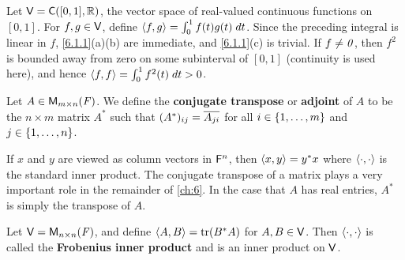 \begin{eg}\label{6.1.4}
  Let \(\V = \cfs([0, 1], \R)\), the vector space of real-valued continuous functions on \([0, 1]\).
  For \(f, g \in \mathsf{V}\), define \(\left\langle f, g\right\rangle = \int_0^1 f(t) g(t) \; dt\).
  Since the preceding integral is linear in \(f\), \cref{6.1.1}(a)(b) are immediate, and \cref{6.1.1}(c) is trivial.
  If \(f \neq \mathit{0}\), then \(f^2\) is bounded away from zero on some subinterval of \([0, 1]\) (continuity is used here), and hence \(\left\langle f, f\right\rangle = \int_0^1 f^2(t) \; dt > 0\).
\end{eg}

\begin{defn}\label{6.1.5}
  Let \(A \in \mathsf{M}_{{m} \times n}({\mathit{F}})\).
  We define the \textbf{conjugate transpose} or \textbf{adjoint} of \(A\) to be the \(n \times m\) matrix \(A^*\) such that \((A^*)_{i j} = \overline{A_{j i}}\) for all \(i \in \left\lbrace1, \dots, m\right\rbrace\) and \(j \in \left\lbrace1, \dots, n\right\rbrace\).
\end{defn}

\begin{note}
  If \(x\) and \(y\) are viewed as column vectors in \(\mathsf{F}^n\), then \(\left\langle x, y\right\rangle = y^* x\) where \(\left\langle\cdot, \cdot\right\rangle\) is the standard inner product.
  The conjugate transpose of a matrix plays a very important role in the remainder of \cref{ch:6}.
  In the case that \(A\) has real entries, \(A^*\) is simply the transpose of \(A\).
\end{note}

\begin{eg}\label{6.1.6}
  Let \(\mathsf{V} = \mathsf{M}_{{n} \times n}({\mathit{F}})\), and define \(\inn{A, B} = \tr(B^* A)\) for \(A, B \in \mathsf{V}\).
  Then \(\left\langle\cdot, \cdot\right\rangle\) is called the \textbf{Frobenius inner product} and is an inner product on \(\mathsf{V}\).
\end{eg}

